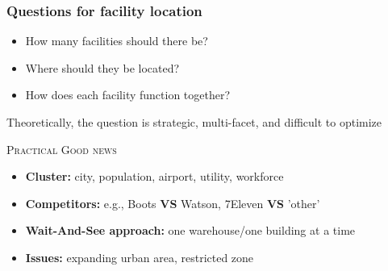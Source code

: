 \documentclass[10pt,handout,notes=show]{beamer}
\begin{document}
\begin{frame}
  \frametitle{Questions for facility location}

  \begin{itemize}
    \item How many facilities should there be?
    \item Where should they be located?
    \item How does each facility function together?
  \end{itemize}

  \NextHalfLine
  \begin{alertblock}{}{}
    Theoretically, the question is strategic, \alert{multi-facet}, and difficult to optimize 
  \end{alertblock}

  \NextLine
  \textsc{Practical Good news}
  \begin{itemize}
    \item \textbf{Cluster:} city, population, airport, utility, workforce
    \item \textbf{Competitors:} e.g., Boots \textbf{VS} Watson, 7Eleven \textbf{VS} 'other'
    \item \textbf{Wait-And-See approach:} one warehouse/one building at a time
    \item \textbf{Issues:} expanding urban area, restricted zone
  \end{itemize}

  \end{frame}
\end{document}
